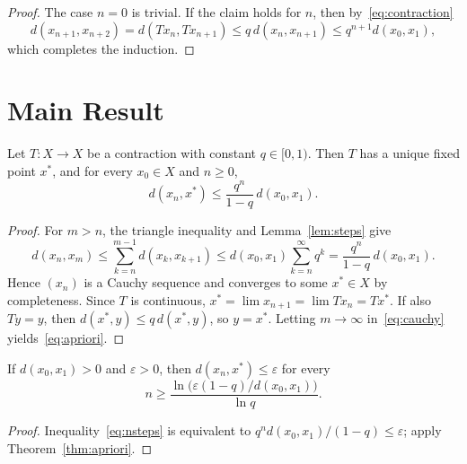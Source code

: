 \documentclass[axioms,article,submit,moreauthors]{Definitions/mdpi}
\begin{document}
\begin{proof}
The case $n=0$ is trivial. If the claim holds for $n$, then by~\eqref{eq:contraction}
\begin{equation}\label{eq:induction}
d(x_{n+1},x_{n+2})=d(Tx_n,Tx_{n+1})\le q\,d(x_n,x_{n+1})\le q^{n+1}d(x_0,x_1),
\end{equation}
which completes the induction.
\end{proof}

\section{Main Result}\label{sec:main}

\begin{Theorem}\label{thm:apriori}
Let $T\colon X\to X$ be a contraction with constant $q\in[0,1)$. Then $T$ has a unique fixed point $x^*$, and for every $x_0\in X$ and $n\ge 0$,
\begin{equation}\label{eq:apriori}
d(x_n,x^*)\le \frac{q^n}{1-q}\,d(x_0,x_1).
\end{equation}
\end{Theorem}

\begin{proof}
For $m>n$, the triangle inequality and Lemma~\ref{lem:steps} give
\begin{equation}\label{eq:cauchy}
d(x_n,x_m)\le\sum_{k=n}^{m-1}d(x_k,x_{k+1})\le d(x_0,x_1)\sum_{k=n}^{\infty}q^k=\frac{q^n}{1-q}\,d(x_0,x_1).
\end{equation}
Hence $(x_n)$ is a Cauchy sequence and converges to some $x^*\in X$ by completeness. Since $T$ is continuous, $x^*=\lim x_{n+1}=\lim Tx_n=Tx^*$. If also $Ty=y$, then $d(x^*,y)\le q\,d(x^*,y)$, so $y=x^*$. Letting $m\to\infty$ in~\eqref{eq:cauchy} yields~\eqref{eq:apriori}.
\end{proof}

\begin{Corollary}\label{cor:steps}
If $d(x_0,x_1)>0$ and $\varepsilon>0$, then $d(x_n,x^*)\le\varepsilon$ for every
\begin{equation}\label{eq:nsteps}
n\ge \frac{\ln\bigl(\varepsilon(1-q)/d(x_0,x_1)\bigr)}{\ln q}.
\end{equation}
\end{Corollary}

\begin{proof}
Inequality~\eqref{eq:nsteps} is equivalent to $q^n d(x_0,x_1)/(1-q)\le\varepsilon$; apply Theorem~\ref{thm:apriori}.
\end{proof}
\end{document}
